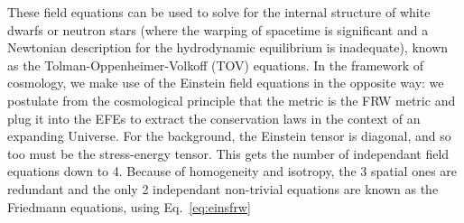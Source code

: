These field equations can be used to solve for the internal structure of white dwarfs or neutron stars (where the warping of spacetime is significant and a Newtonian description for the hydrodynamic equilibrium is inadequate), known as the Tolman-Oppenheimer-Volkoff (TOV) equations. In the framework of cosmology, we make use of the Einstein field equations in the opposite way: we postulate from the cosmological principle that the metric is the FRW metric and plug it into the EFEs to extract the conservation laws in the context of an expanding Universe. For the background, the Einstein tensor is diagonal, and so too must be the stress-energy tensor. This gets the number of independant field equations down to 4. Because of homogeneity and isotropy, the 3 spatial ones are redundant and the only 2 independant non-trivial equations are known as the Friedmann equations, using Eq.~\ref{eq:einsfrw}\\

